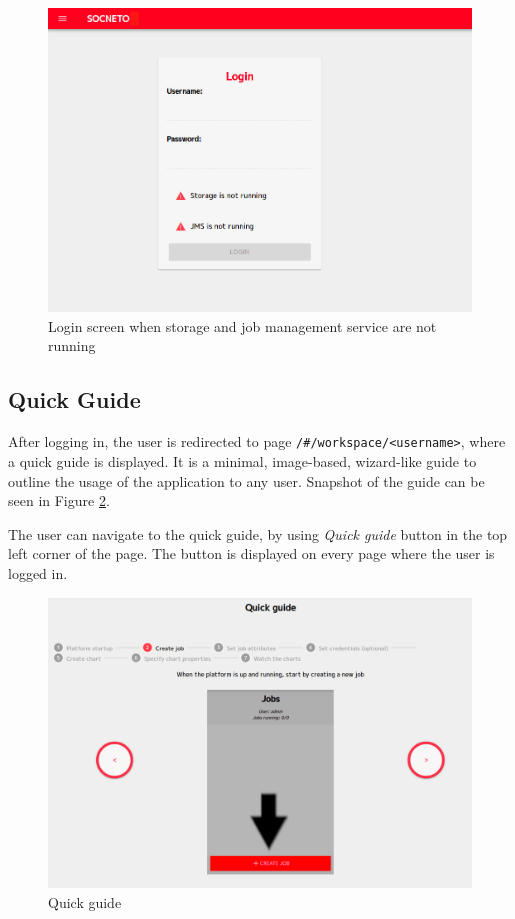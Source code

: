 \documentclass{article}
\begin{document}
\begin{figure}[h]
\includegraphics[width=\textwidth]{images/login.png}
\caption{Login screen when storage and job management service are not running}
\label{figure:login}
\centering
\end{figure}

\subsection{Quick Guide}

After logging in, the user is redirected to page \texttt{/\#/workspace/<username>}, where a quick guide is displayed. It is a minimal, image-based, wizard-like guide to outline the usage of the application to any user. Snapshot of the guide can be seen in Figure \ref{figure:quickguide}.

The user can navigate to the quick guide, by using \textit{Quick guide} button in the top left corner of the page. The button is displayed on every page where the user is logged in.

\begin{figure}[h]
\includegraphics[width=\textwidth]{images/quick_guide.png}
\caption{Quick guide}
\label{figure:quickguide}
\centering
\end{figure}
\end{document}
